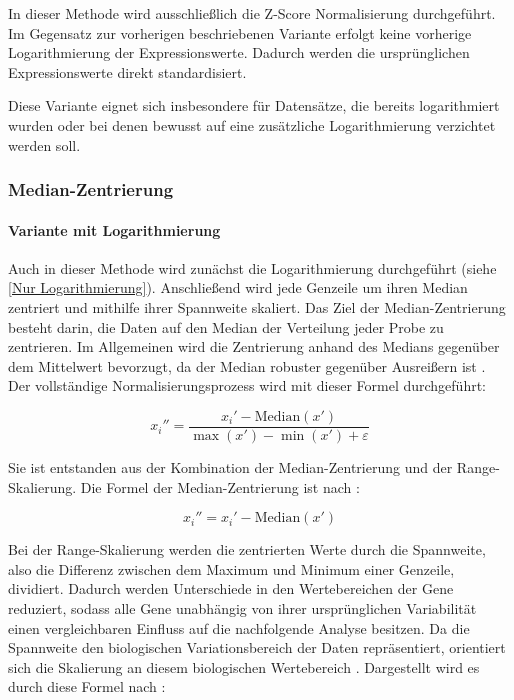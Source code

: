 \documentclass[12pt]{article}
\begin{document}
In dieser Methode wird ausschließlich die Z-Score Normalisierung durchgeführt. Im Gegensatz zur vorherigen beschriebenen Variante erfolgt keine vorherige Logarithmierung der Expressionswerte. Dadurch werden die ursprünglichen Expressionswerte direkt standardisiert.

Diese Variante eignet sich insbesondere für Datensätze, die bereits logarithmiert wurden oder bei denen bewusst auf eine zusätzliche Logarithmierung verzichtet werden soll.


\subsubsection{Median-Zentrierung}
\label{Median-Zentrierung}

\paragraph{Variante mit Logarithmierung}
Auch in dieser Methode wird zunächst die Logarithmierung durchgeführt (siehe \ref{Nur Logarithmierung}). Anschließend wird jede Genzeile um ihren Median zentriert und mithilfe ihrer Spannweite skaliert. Das Ziel der Median-Zentrierung besteht darin, die Daten auf den Median der Verteilung jeder Probe zu zentrieren. Im Allgemeinen wird die Zentrierung anhand des Medians gegenüber dem Mittelwert bevorzugt, da der Median robuster gegenüber Ausreißern ist \cite{DUBOIS2022104661}. Der vollständige Normalisierungsprozess wird mit dieser Formel durchgeführt:

\[
x_i''=\frac{x_i'-\mathrm{Median}(x')}{\max(x')-\min(x')+\varepsilon}
\]

Sie ist entstanden aus der Kombination der Median-Zentrierung und der Range-Skalierung.
Die Formel der Median-Zentrierung ist nach \cite{DUBOIS2022104661}: 

\[
x_i''={x_i'-\mathrm{Median}(x')}
\] 

Bei der Range-Skalierung werden die zentrierten Werte durch die Spannweite, also die Differenz zwischen dem Maximum und Minimum einer Genzeile, dividiert. Dadurch werden Unterschiede in den Wertebereichen der Gene reduziert, sodass alle Gene unabhängig von ihrer ursprünglichen Variabilität einen vergleichbaren Einfluss auf die nachfolgende Analyse besitzen. Da die Spannweite den biologischen Variationsbereich der Daten repräsentiert, orientiert sich die Skalierung an diesem biologischen Wertebereich \cite{medianCentering}. Dargestellt wird es durch diese Formel nach \cite{medianCentering}:
\end{document}
